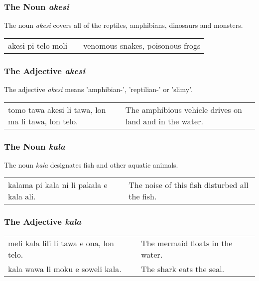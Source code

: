 %
%
\subsubsection*{The Noun \textit{akesi}}
%
%
The noun \textit{akesi} covers all of the reptiles, amphibians, dinosaurs and monsters.

\begin{supertabular}{p{5,5cm}|ll}
akesi pi telo moli && venomous snakes, poisonous frogs \\
\end{supertabular} 

%
%
\subsubsection*{The Adjective \textit{akesi}}
%
%
The adjective \textit{akesi} means 'amphibian-', 'reptilian-' or 'slimy'.

\begin{supertabular}{p{5,5cm}|ll}
tomo tawa akesi li tawa, lon ma li tawa, lon telo. && The amphibious vehicle drives on land and in the water. \\
\end{supertabular} 

%
%
\subsubsection*{The Noun \textit{kala}}
%
%
The noun \textit{kala} designates fish and other aquatic animals. 

\begin{supertabular}{p{5,5cm}|ll}
kalama pi kala ni li pakala e kala ali. && The noise of this fish disturbed all the fish. \\
\end{supertabular} 

%
\subsubsection*{The Adjective \textit{kala}}
%
%
\begin{supertabular}{p{5,5cm}|ll}
meli kala lili li tawa e ona, lon telo. && The mermaid floats in the water.  \\
kala wawa li moku e soweli kala. && The shark eats the seal.  \\
\end{supertabular} 

